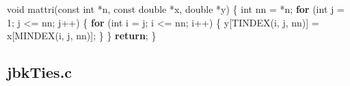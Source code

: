 \documentclass[
  12pt,
  letterpaper,
  DIV=11,
  numbers=noendperiod]{scrreprt}
\newenvironment{Shaded}{\begin{snugshade}}{\end{snugshade}}
\newcommand{\ControlFlowTok}[1]{\textcolor[rgb]{0.00,0.23,0.31}{\textbf{#1}}}
\newcommand{\DataTypeTok}[1]{\textcolor[rgb]{0.68,0.00,0.00}{#1}}
\newcommand{\DecValTok}[1]{\textcolor[rgb]{0.68,0.00,0.00}{#1}}
\newcommand{\NormalTok}[1]{\textcolor[rgb]{0.00,0.23,0.31}{#1}}
\newcommand{\OperatorTok}[1]{\textcolor[rgb]{0.37,0.37,0.37}{#1}}
\theoremstyle{remark}
\begin{document}
\begin{Shaded}
\begin{Highlighting}[]
\DataTypeTok{void}\NormalTok{ mattri}\OperatorTok{(}\DataTypeTok{const} \DataTypeTok{int} \OperatorTok{*}\NormalTok{n}\OperatorTok{,} \DataTypeTok{const} \DataTypeTok{double} \OperatorTok{*}\NormalTok{x}\OperatorTok{,} \DataTypeTok{double} \OperatorTok{*}\NormalTok{y}\OperatorTok{)} \OperatorTok{\{}
    \DataTypeTok{int}\NormalTok{ nn }\OperatorTok{=} \OperatorTok{*}\NormalTok{n}\OperatorTok{;}
    \ControlFlowTok{for} \OperatorTok{(}\DataTypeTok{int}\NormalTok{ j }\OperatorTok{=} \DecValTok{1}\OperatorTok{;}\NormalTok{ j }\OperatorTok{\textless{}=}\NormalTok{ nn}\OperatorTok{;}\NormalTok{ j}\OperatorTok{++)} \OperatorTok{\{}
        \ControlFlowTok{for} \OperatorTok{(}\DataTypeTok{int}\NormalTok{ i }\OperatorTok{=}\NormalTok{ j}\OperatorTok{;}\NormalTok{ i }\OperatorTok{\textless{}=}\NormalTok{ nn}\OperatorTok{;}\NormalTok{ i}\OperatorTok{++)} \OperatorTok{\{}
\NormalTok{            y}\OperatorTok{[}\NormalTok{TINDEX}\OperatorTok{(}\NormalTok{i}\OperatorTok{,}\NormalTok{ j}\OperatorTok{,}\NormalTok{ nn}\OperatorTok{)]} \OperatorTok{=}\NormalTok{ x}\OperatorTok{[}\NormalTok{MINDEX}\OperatorTok{(}\NormalTok{i}\OperatorTok{,}\NormalTok{ j}\OperatorTok{,}\NormalTok{ nn}\OperatorTok{)];}
        \OperatorTok{\}}
    \OperatorTok{\}}
    \ControlFlowTok{return}\OperatorTok{;}
\OperatorTok{\}}
\end{Highlighting}
\end{Shaded}

\subsection*{jbkTies.c}\label{jbkties.c}
\end{document}
